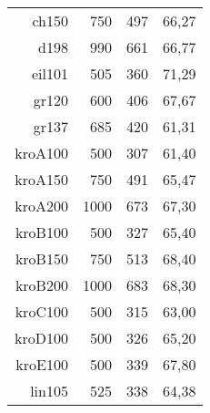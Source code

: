 \begin{table}[!htbp]
\begin{tabular}{||r|r|r|r||}
		ch150         & 750                               & 497                              & 66,27                                                \\
		d198          & 990                               & 661                              & 66,77                                                \\
		eil101        & 505                               & 360                              & 71,29                                                \\
		gr120         & 600                               & 406                              & 67,67                                                \\
		gr137         & 685                               & 420                              & 61,31                                                \\
		kroA100       & 500                               & 307                              & 61,40                                                \\
		kroA150       & 750                               & 491                              & 65,47                                                \\
		kroA200       & 1000                              & 673                              & 67,30                                                \\
		kroB100       & 500                               & 327                              & 65,40                                                \\
		kroB150       & 750                               & 513                              & 68,40                                                \\
		kroB200       & 1000                              & 683                              & 68,30                                                \\
		kroC100       & 500                               & 315                              & 63,00                                                \\
		kroD100       & 500                               & 326                              & 65,20                                                \\
		kroE100       & 500                               & 339                              & 67,80                                                \\
		lin105        & 525                               & 338                              & 64,38                                                \\

\end{tabular}
\end{table}
